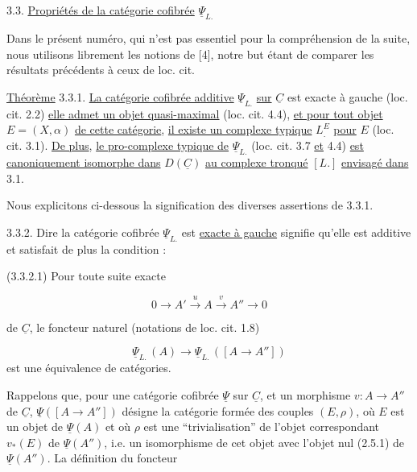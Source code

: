 3.3. \underline{Propriétés de la catégorie cofibrée} $\underline{\Psi}_{L.}$

Dans le présent numéro, qui n'est pas essentiel pour la compréhension de la suite, nous utilisons librement les notions de [4], notre but étant de comparer les résultats précédents à ceux de loc. cit.

\underline{Théorème} 3.3.1. \underline{La catégorie cofibrée additive} $\underline{\Psi}_{L.}$ \underline{sur} $\underline{C}$ est exacte à gauche (loc. cit. 2.2) \underline{elle admet un objet quasi-maximal} (loc. cit. 4.4), \underline{et pour tout objet} $E = (X,\alpha)$ \underline{de cette catégorie}, \underline{il existe un complexe typique} $L^E_{.}$ \underline{pour} $E$ (loc. cit. 3.1). \underline{De plus}, \underline{le pro-complexe typique de} $\underline{\Psi}_{L.}$ (loc. cit. 3.7 \underline{et} 4.4) \underline{est canoniquement isomorphe dans} $D(\underline{C})$ \underline{au complexe tronqué} $[L.]$ \underline{envisagé dans} 3.1.

Nous explicitons ci-dessous la signification des diverses assertions de 3.3.1.

3.3.2. Dire la catégorie cofibrée $\underline{\Psi}_{L.}$ est \underline{exacte à gauche} signifie qu'elle est additive et satisfait de plus la condition :

(3.3.2.1) Pour toute suite exacte

\begin{equation*}
0 \longrightarrow A' \stackrel{u}{\longrightarrow} A \stackrel{v}{\longrightarrow} A'' \longrightarrow 0 
\end{equation*}


 de $\underline{C}$, le foncteur naturel (notations de loc. cit. 1.8)

\begin{equation*}
\underline{\Psi}_{L.}\,(A) \longrightarrow \underline{\Psi}_{L.}\,([A \longrightarrow A''])
\end{equation*}
est une équivalence de catégories.

Rappelons que, pour une catégorie cofibrée $\underline{\Psi}$ sur $\underline{C}$, et un morphisme $v : A \longrightarrow A''$ de $\underline{C}$, $\underline{\Psi}([A \longrightarrow A''])$ désigne la catégorie formée des couples $(E,\rho)$, où $E$ est un objet de $\underline{\Psi}(A)$ et où $\rho$ est une ``trivialisation'' de l'objet correspondant $v_*(E)$ de $\underline{\Psi}(A'')$, i.e. un isomorphisme de cet objet avec l'objet nul (2.5.1) de $\underline{\Psi}(A'')$. La définition du foncteur

